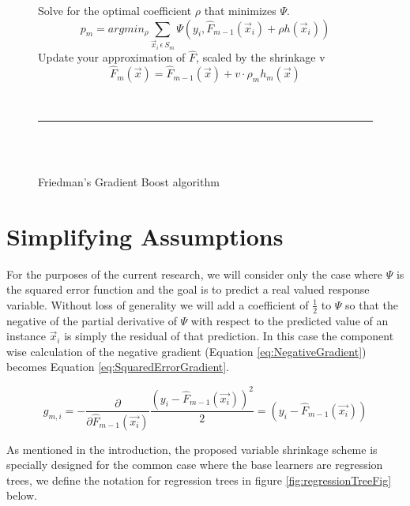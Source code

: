 \documentclass[9pt, conference]{IEEEtran}
\begin{document}
\begin{figure}[t]
\begin{algorithm}[H]
{\begin{equation}
			\end{equation}		
			Solve for the optimal coefficient \(\rho\) that minimizes \(\Psi\).
			\begin{equation}
			p_m = argmin_\rho \sum_{\vec{x}_i \, \epsilon \, S_m}\Psi(y_i, \hat{F}_{m-1}(\vec{x}_i) + \rho h(\vec{x}_i))
			\label{eq:ScalingCoefficent}
			\end{equation}
			Update your approximation of \(\hat{F}\), scaled by the shrinkage v
			\begin{equation}
			\hat{F}_m(\vec{x}) = \hat{F}_{m-1}(\vec{x}) + v  \cdot  \rho_m h_m(\vec{x})
			\label{eq:UpdateStep}
			\end{equation}
		}
		\caption{Friedman's Gradient Boost algorithm  \cite{2001Friedman} \cite{GBMTut} \cite{2002Friedman} \cite{death2007ABT}}
		\hspace{1 mm} \\\hrule\hspace{1 mm} \\\hspace{1 mm} \\
		\label{alg:GeneralGradientBoost}
	\end{algorithm}

\end{figure}
\section{Simplifying Assumptions}
\label{sec:SimplifyingAssumptions}
For the purposes of the current research, we will consider only the case where \(\Psi\) is the squared error function and the goal is to predict a real valued response variable. Without loss of generality we will add a coefficient of \(\frac{1}{2}\) to \(\Psi\) so that the negative of the partial derivative of \(\Psi\) with respect to the predicted value of an instance \(\vec{x}_i\) is simply the residual of that prediction. In this case the component wise calculation of the negative gradient (Equation \ref{eq:NegativeGradient}) becomes Equation \ref{eq:SquaredErrorGradient}.

\begin{equation}
g_{m,i} = -\frac{\partial}{\partial \hat{F}_{m-1}(\vec{x_i})} \frac{(y_i - \hat{F}_{m-1}(\vec{x_i}))^2}{2} = (y_i - \hat{F}_{m-1}(\vec{x_i}))
\label{eq:SquaredErrorGradient}
\end{equation}

As mentioned in the introduction, the proposed variable shrinkage scheme is specially designed for the common case where the base learners are regression trees, we define the notation for regression trees in figure \ref{fig:regressionTreeFig} below.
\end{document}
